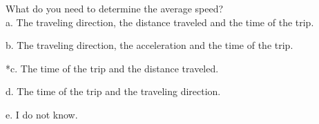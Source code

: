 
What do you need to determine the average speed? \\

a. The traveling direction, the distance traveled and the time of the trip.

b. The traveling direction, the acceleration and the time of the trip.

*c. The time of the trip and the distance traveled. 

d. The time of the trip and the traveling direction. 

e. I do not know. \\
